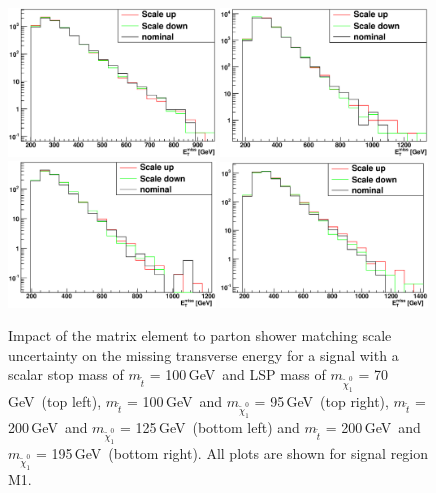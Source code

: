 \begin{figure}[tb]
\begin{center}
  \includegraphics[width=0.49\textwidth]{Interpretations/Figures/stop_100_70_Q.eps} 
  \includegraphics[width=0.49\textwidth]{Interpretations/Figures/stop_100_95_Q.eps} 
  \includegraphics[width=0.49\textwidth]{Interpretations/Figures/stop_200_125_Q.eps}
  \includegraphics[width=0.49\textwidth]{Interpretations/Figures/stop_200_195_Q.eps}
\end{center}
\caption[Impact of the MLM matching scale uncertainty on several signal models.]{Impact of the matrix element to parton shower matching scale uncertainty on the missing transverse energy for a signal with a scalar
  stop mass of $m_{\tilde{t}}$ = 100\,GeV\ and LSP mass of
  $m_{\tilde{\chi}^0_1}$ = 70\,GeV\ (top left), $m_{\tilde{t}}$ = 100\,GeV\ and
  $m_{\tilde{\chi}^0_1}$ = 95\,GeV\ (top right), $m_{\tilde{t}}$ = 200\,GeV\ and
  $m_{\tilde{\chi}^0_1}$ = 125\,GeV\ (bottom left) and $m_{\tilde{t}}$ = 200\,GeV\ and
  $m_{\tilde{\chi}^0_1}$ = 195\,GeV\ (bottom right).  All plots are
  shown for signal region M1.}
\label{fig:signalmlmsysta6}
\end{figure}


